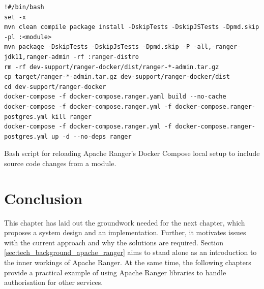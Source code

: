 \begin{listing}
\begin{verbatim}
!#/bin/bash
set -x
mvn clean compile package install -DskipTests -DskipJSTests -Dpmd.skip -pl :<module>
mvn package -DskipTests -DskipJsTests -Dpmd.skip -P -all,-ranger-jdk11,ranger-admin -rf :ranger-distro
rm -rf dev-support/ranger-docker/dist/ranger-*-admin.tar.gz
cp target/ranger-*-admin.tar.gz dev-support/ranger-docker/dist
cd dev-support/ranger-docker
docker-compose -f docker-compose.ranger.yaml build --no-cache
docker-compose -f docker-compose.ranger.yml -f docker-compose.ranger-postgres.yml kill ranger
docker-compose -f docker-compose.ranger.yml -f docker-compose.ranger-postgres.yml up -d --no-deps ranger
\end{verbatim}
\caption{\label{listing:ranger_module_reload_bash} Bash script for reloading Apache Ranger's Docker Compose local setup to include source code changes from a module.}
\end{listing}


\section{Conclusion}

This chapter has laid out the groundwork needed for the next chapter, which proposes a system design and an implementation. Further, it motivates issues with the current approach and why the solutions are required. Section \ref{sec:tech_background_apache_ranger} aims to stand alone as an introduction to the inner workings of Apache Ranger. At the same time, the following chapters provide a practical example of using Apache Ranger libraries to handle authorisation for other services.

